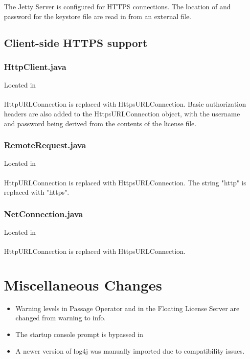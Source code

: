 \documentclass[]{article}
\begin{document}
The Jetty Server is configured for HTTPS connections. The location of and password for the keystore file are read in from an external file. 

\subsection{Client-side HTTPS support}
\subsubsection{HttpClient.java}
Located in \\
 \\

HttpURLConnection is replaced with HttpsURLConnection. Basic authorization headers are also added to the HttpsURLConnection object, with the username and password being derived from the contents of the license file.

\subsubsection{RemoteRequest.java}
Located in \\
 \\

HttpURLConnection is replaced with HttpsURLConnection. The string "http" is replaced with "https".

\subsubsection{NetConnection.java}
Located in \\
 \\

HttpURLConnection is replaced with HttpsURLConnection.

\section{Miscellaneous Changes}

\begin{itemize}
	\item Warning levels in Passage Operator and in the Floating License Server are changed from warning to info.
	\item The startup console prompt is bypassed in \\
	\item A newer version of log4j was manually imported due to compatibility issues.
\end{itemize}
\end{document}
